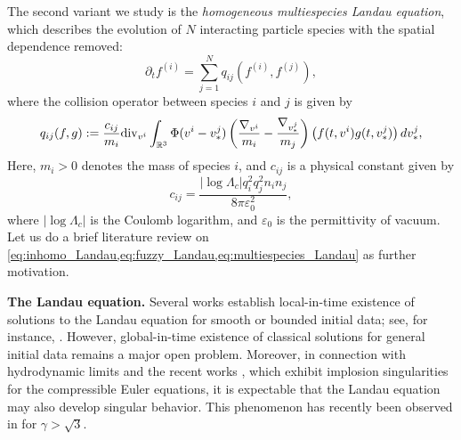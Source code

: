 \documentclass[10pt,oneside]{amsart}
\numberwithin{equation}{section}
\numberwithin{definition}{section}
\numberwithin{theorem}{section}
\numberwithin{lemma}{section}
\begin{document}
The second variant we study is the \emph{homogeneous multiespecies Landau equation}, which describes the evolution of $N$ interacting particle species with the spatial dependence removed:
%
\begin{equation}\label{eq:multiespecies_Landau}
  \partial_t f^{(i)} = \sum_{j=1}^N q_{ij}(f^{(i)},f^{(j)}),
\end{equation}
%
where the collision operator between species $i$ and $j$ is given by
%
\begin{equation*}
  q_{ij}(f,g) := \frac{c_{ij}}{m_{i}}\textnormal{div}_{v^{i}}\int_{\mathbb R^3} \Phi(v^{i}-v^{j}_*)\left(\frac{\nabla_{v^{i}}}{m_{i}}-\frac{\nabla_{v^{j}_*}}{m_{j}}\right)\big(f(t,v^{i})g(t,v^{j}_*)\big)\,dv^{j}_*,
\end{equation*}
%
Here, $m_i>0$ denotes the mass of species $i$, and $c_{ij}$ is a physical constant given by
%
\begin{equation*}
  c_{ij} = \frac{|\log \Lambda_c|q_i^2q_j^2n_in_j}{8\pi\varepsilon_0^2},
\end{equation*}
% 
where $|\log \Lambda_c|$ is the Coulomb logarithm, and $\varepsilon_0$ is the permittivity of vacuum. Let us do a brief literature review on \cref{eq:inhomo_Landau,eq:fuzzy_Landau,eq:multiespecies_Landau} as further motivation.

\textbf{The Landau equation.} Several works establish local-in-time existence of solutions to the Landau equation for smooth or bounded initial data; see, for instance, \cite{HeYang2014WellPosedBoltzLandau,henderson2019localExistenceLandau,HendSnelTarfu2020LocalSolLandau}. However, global-in-time existence of classical solutions for general initial data remains a major open problem. Moreover, in connection with hydrodynamic limits and the recent works \cite{MerleRaphRodSze2022ImplosionEuler1,MerleRaphRodSze2022ImplosionEuler2}, which exhibit implosion singularities for the compressible Euler equations, it is expectable that the Landau equation may also develop singular behavior. This phenomenon has recently been observed in \cite{gualdani2026Singularities} for $\gamma > \sqrt{3}$.
\end{document}
